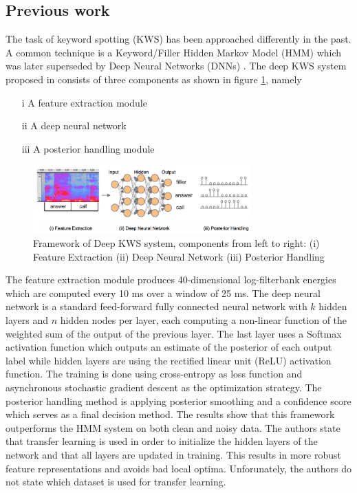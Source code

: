 \documentclass{article}
\theoremstyle{definition}
\theoremstyle{remark}
\begin{document}
\newpage





\subsection{Previous work}

The task of keyword spotting (KWS) has been approached differently in the past. A common technique is a Keyword/Filler Hidden Markov Model (HMM) which was later superseded by Deep Neural Networks (DNNs) \cite{chen2014small}. The deep KWS system proposed in \cite{chen2014small} consists of three components as shown in figure \ref{fig:deep_kws_system_frameworkl}, namely

\begin{enumerate}
	\item[i] A feature extraction module
	\item[ii] A deep neural network
	\item[iii] A posterior handling module
\end{enumerate}

\begin{figure}[h]
    \centering
    \includegraphics[width=0.75\textwidth]{img/papers/cnns_for_keyword_spotting/deep_kws_system_framework.png}
    \caption{Framework of Deep KWS system, components from
left to right: (i) Feature Extraction (ii) Deep Neural Network
(iii) Posterior Handling}
    \label{fig:deep_kws_system_frameworkl}
\end{figure}

The feature extraction module produces 40-dimensional log-filterbank energies which are computed every 10 ms over a window of 25 ms. The deep neural network is a standard feed-forward fully connected neural network with $k$ hidden layers and $n$ hidden nodes per layer, each computing a non-linear function of the weighted sum of the output of the previous layer. The last layer uses a Softmax activation function which outputs an estimate of the posterior of each output label while hidden layers are using the rectified linear unit (ReLU) activation function. The training is done using cross-entropy as loss function and asynchronous stochastic gradient descent as the optimization strategy. The posterior handling method is applying posterior smoothing and a confidence score which serves as a final decision method. The results show that this framework outperforms the HMM system on both clean and noisy data. The authors state that transfer learning is used in order to initialize the hidden layers of the network and that all layers are updated in training. This results in more robust feature representations and avoids bad local optima. Unforunately, the authors do not state which dataset is used for transfer learning.\\
\end{document}
